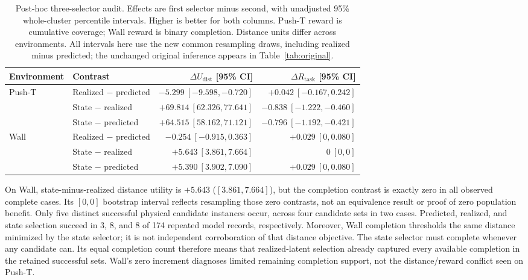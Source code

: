 \documentclass{article}
\begin{document}
\begin{table}[t]
\caption{Post-hoc three-selector audit. Effects are first selector minus
second, with unadjusted 95\% whole-cluster percentile intervals. Higher is better for
both columns. Push-T reward is cumulative coverage; Wall reward is binary
completion. Distance units differ across environments. All intervals here
use the new common resampling draws, including realized minus predicted;
the unchanged original inference appears in Table~\ref{tab:original}.}
\label{tab:ladder}
\centering\small
\begin{tabular}{llrr}
\toprule
Environment & Contrast & $\Delta U_{\mathrm{dist}}$ [95\% CI] & $\Delta R_{\mathrm{task}}$ [95\% CI]\\
\midrule
Push-T & Realized $-$ predicted & $-5.299\ [-9.598,-0.720]$ & $+0.042\ [-0.167,0.242]$\\
 & State $-$ realized & $+69.814\ [62.326,77.641]$ & $-0.838\ [-1.222,-0.460]$\\
 & State $-$ predicted & $+64.515\ [58.162,71.121]$ & $-0.796\ [-1.192,-0.421]$\\
\addlinespace
Wall & Realized $-$ predicted & $-0.254\ [-0.915,0.363]$ & $+0.029\ [0,0.080]$\\
 & State $-$ realized & $+5.643\ [3.861,7.664]$ & $0\ [0,0]$\\
 & State $-$ predicted & $+5.390\ [3.902,7.090]$ & $+0.029\ [0,0.080]$\\
\bottomrule
\end{tabular}
\end{table}

On Wall, state-minus-realized distance utility is $+5.643$
($[3.861,7.664]$), but the completion contrast is exactly zero in all observed
complete cases. Its $[0,0]$ bootstrap interval reflects resampling those zero
contrasts, not an equivalence result or proof of zero population benefit.
Only five distinct successful physical candidate instances occur, across four
candidate sets in two cases. Predicted, realized, and state selection succeed
in 3, 8, and 8 of 174 repeated model records, respectively. Moreover, Wall
completion thresholds the same distance minimized by the state selector;
it is not independent corroboration of that distance objective. The state
selector must complete whenever any candidate can. Its equal completion count
therefore means that realized-latent selection already captured every available
completion in the retained successful sets. Wall's zero increment diagnoses
limited remaining completion support, not the distance/reward conflict seen on
Push-T.
\end{document}

